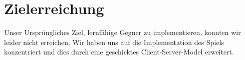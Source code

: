 \section{Zielerreichung}

Unser Ursprüngliches Ziel, lernfähige Gegner zu implementieren, konnten wir leider nicht erreichen. Wir haben uns auf die Implementation des Spiels konzentriert und dies durch eine geschicktes Client-Server-Model erweitert. 
